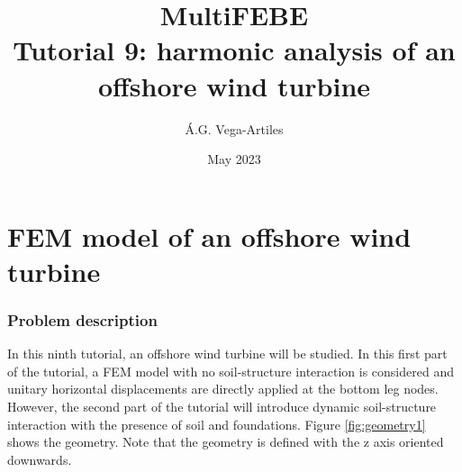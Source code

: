 \documentclass[a4]{article}
\title{MultiFEBE \\ Tutorial 9: harmonic analysis of an offshore wind turbine}
\author{\'A.G. Vega-Artiles}
\date{May 2023}
\begin{document}
\maketitle

\tableofcontents

\part{FEM model of an offshore wind turbine}

\section{Problem description}

In this ninth tutorial, an offshore wind turbine will be studied. In this first part of the tutorial, a FEM model with no soil-structure interaction is considered and unitary horizontal displacements are directly applied at the bottom leg nodes. However, the second part of the tutorial will introduce dynamic soil-structure interaction with the presence of soil and foundations. Figure \ref{fig:geometry1} shows the geometry. Note that the geometry is defined with the z axis oriented downwards.
\end{document}
